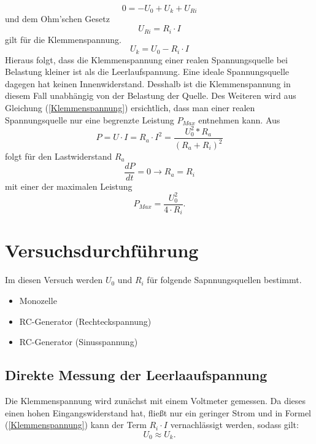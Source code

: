 \documentclass[11pt]{article}
\begin{document}
\begin{equation}
0 = -U_0 + U_k + U_{Ri}
\end{equation}
und dem Ohm'schen Gesetz
\begin{equation}
U_{Ri} = R_i \cdot I
\end{equation}
gilt f\"ur die Klemmenspannung.
\begin{equation}
U_k = U_0 - R_i \cdot I
\label{Klemmenspannung}
\end{equation}
Hieraus folgt, dass die Klemmenspannung einer realen Spannungsquelle bei Belastung kleiner ist als die Leerlaufspannung. Eine ideale Spannungsquelle dagegen hat keinen Innenwiderstand. Desshalb ist die Klemmenspannung in diesem Fall unabh\"angig von der Belastung der Quelle.
Des Weiteren wird aus Gleichung (\ref{Klemmenspannung}) ersichtlich, dass man einer realen Spannungsquelle nur eine begrenzte Leistung $P_{Max}$ entnehmen kann. Aus 
\begin{equation}
P = U \cdot I = R_a \cdot I^2 = \frac{U_0^2 * R_a}{(R_a+R_i)^2}
\end{equation}
folgt f\"ur den Lastwiderstand $R_a$
\begin{equation}
\frac{dP}{dt} = 0 \rightarrow R_a = R_i
\end{equation}
mit einer der maximalen Leistung 
\begin{equation}
P_{Max} = \frac{U_0^2}{4\cdot R_i}.
\end{equation}

\section{Versuchsdurchf\"uhrung}
Im diesen Versuch werden $U_0$ und $R_i$ f\"ur folgende Sapnnungsquellen bestimmt. 
\begin{itemize}
\item Monozelle
\item RC-Generator (Rechteckspannung)
\item RC-Generator (Sinusspannung)
\end{itemize}
\subsection{Direkte Messung der Leerlaaufspannung}
Die Klemmenspannung wird zun\"achst mit einem Voltmeter gemessen. Da dieses einen hohen Eingangswiderstand hat, flie\ss t nur ein geringer Strom und in Formel (\ref{Klemmenspannung}) kann der Term $R_i \cdot I$ vernachl\"assigt werden, sodass gilt: 
\begin{equation}
U_0 \approx U_k.
\end{equation} 
\end{document}
